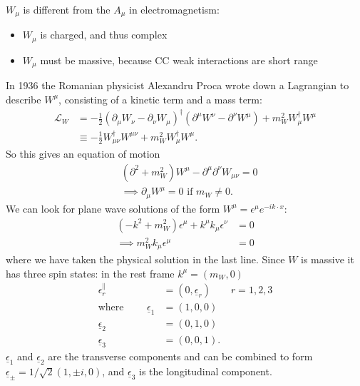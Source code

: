 $W_\mu$ is different from the $A_\mu$ in electromagnetism: 
\begin{itemize}
\item $W_\mu$ is charged, and thus complex
\item $W_\mu$ must be massive, because CC weak interactions are short range
\end{itemize}
In 1936 the Romanian physicist Alexandru Proca wrote down a Lagrangian to describe $W^\mu$, consisting of a kinetic term and a mass term:
\begin{equation}
\begin{split}
\mathcal{L}_W &= - \frac{1}{2}(\partial_\mu W_\nu - \partial_\nu W_\mu)^\dagger(\partial^\mu W^\nu - \partial^\nu W^\mu) + m_W^2 W_\mu^\dagger W^\mu \\
&\equiv -\frac{1}{2}W_{\mu \nu}^\dagger W^{\mu \nu} + m_W^2 W_\mu^\dagger W^\mu .
\end{split}
\end{equation}
So this gives an equation of motion
\begin{equation}
\begin{split}
&(\partial^2 + m_W^2) W^\mu - \partial^\mu \partial^\nu W_{\mu \nu} = 0 \\
&\implies \partial_\mu W^\mu =0 \text{ if } m_W \neq 0.
\end{split}
\end{equation}
We can look for plane wave solutions of the form $W^\mu = \epsilon^\mu e^{-i k \cdot x}$:
\begin{equation}
\begin{split}
(-k^2 + m_W^2)\epsilon^\mu + k^\mu k_\mu \epsilon^\nu &= 0 \\
\implies m_W^2 k_\mu \epsilon^\mu &= 0 
\end{split}
\end{equation}
where we have taken the physical solution in the last line. Since $W$ is massive it has three spin states: in the rest frame $k^\mu = (m_W, 0)$
\begin{equation}
\begin{split}
\epsilon_r^\parallel &= (0, \underline{\epsilon}_r) \qquad r=1,2,3 \\
\text{where } \qquad \underline{\epsilon}_1 &= (1,0,0) \\
\underline{\epsilon}_2 &= (0,1,0) \\
\underline{\epsilon}_3 &= (0,0,1). 
\end{split}
\end{equation}
$\underline{\epsilon}_1$ and $\underline{\epsilon}_2$ are the transverse components and can be combined to form $\underline{\epsilon}_\pm = 1/\sqrt{2}(1, \pm i, 0)$, and $\underline{\epsilon}_3$ is the longitudinal component. 

